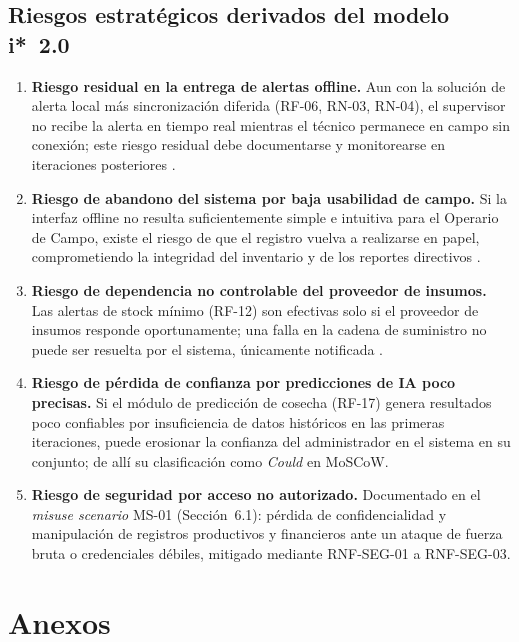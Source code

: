 \documentclass[12pt,a4paper]{article}
\begin{document}
\subsection{Riesgos estratégicos derivados del modelo i*~2.0}

\begin{enumerate}[nosep]
  \item \textbf{Riesgo residual en la entrega de alertas offline.} Aun con la
  solución de alerta local más sincronización diferida (RF-06, RN-03, RN-04),
  el supervisor no recibe la alerta en tiempo real mientras el técnico
  permanece en campo sin conexión; este riesgo residual debe documentarse y
  monitorearse en iteraciones posteriores \cite{Yu1995}.
  \item \textbf{Riesgo de abandono del sistema por baja usabilidad de campo.}
  Si la interfaz offline no resulta suficientemente simple e intuitiva para el
  Operario de Campo, existe el riesgo de que el registro vuelva a realizarse en
  papel, comprometiendo la integridad del inventario y de los reportes
  directivos \cite{ISO25010:2023}.
  \item \textbf{Riesgo de dependencia no controlable del proveedor de
  insumos.} Las alertas de stock mínimo (RF-12) son efectivas solo si el
  proveedor de insumos responde oportunamente; una falla en la cadena de
  suministro no puede ser resuelta por el sistema, únicamente notificada
  \cite{Yu1995}.
  \item \textbf{Riesgo de pérdida de confianza por predicciones de IA poco
  precisas.} Si el módulo de predicción de cosecha (RF-17) genera resultados
  poco confiables por insuficiencia de datos históricos en las primeras
  iteraciones, puede erosionar la confianza del administrador en el sistema en
  su conjunto; de allí su clasificación como \textit{Could} en MoSCoW.
  \item \textbf{Riesgo de seguridad por acceso no autorizado.} Documentado en
  el \textit{misuse scenario} MS-01 (Sección~6.1): pérdida de confidencialidad
  y manipulación de registros productivos y financieros ante un ataque de
  fuerza bruta o credenciales débiles, mitigado mediante RNF-SEG-01 a
  RNF-SEG-03.
\end{enumerate}


\section{Anexos}
\end{document}
